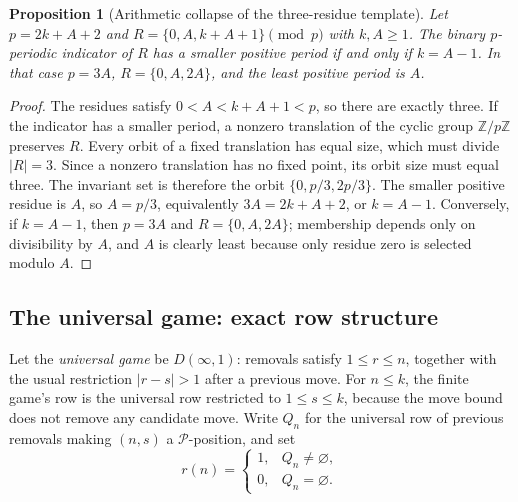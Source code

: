 \documentclass[11pt]{article}
\newtheorem{proposition}[theorem]{Proposition}
\theoremstyle{remark}
\newcommand{\Pset}{\mathcal{P}}
\begin{document}
\begin{proposition}[Arithmetic collapse of the three-residue template]\label{prop:Ccollapse}
Let $p=2k+A+2$ and $R=\{0,A,k+A+1\}\pmod p$ with $k,A\ge1$. The binary $p$-periodic indicator of $R$ has a smaller positive period if and only if $k=A-1$. In that case $p=3A$, $R=\{0,A,2A\}$, and the least positive period is $A$.
\end{proposition}
\begin{proof}
The residues satisfy $0<A<k+A+1<p$, so there are exactly three. If the indicator has a smaller period, a nonzero translation of the cyclic group $\mathbb Z/p\mathbb Z$ preserves $R$. Every orbit of a fixed translation has equal size, which must divide $|R|=3$. Since a nonzero translation has no fixed point, its orbit size must equal three. The invariant set is therefore the orbit $\{0,p/3,2p/3\}$. The smaller positive residue is $A$, so $A=p/3$, equivalently $3A=2k+A+2$, or $k=A-1$. Conversely, if $k=A-1$, then $p=3A$ and $R=\{0,A,2A\}$; membership depends only on divisibility by $A$, and $A$ is clearly least because only residue zero is selected modulo $A$.
\end{proof}

\subsection{The universal game: exact row structure}\label{sec:Cuniversal}
Let the \emph{universal game} be $D(\infty,1)$: removals satisfy $1\le r\le n$, together with the usual restriction $|r-s|>1$ after a previous move. For $n\le k$, the finite game's row is the universal row restricted to $1\le s\le k$, because the move bound does not remove any candidate move. Write $Q_n$ for the universal row of previous removals making $(n,s)$ a $\Pset$-position, and set
\[
r(n)=\begin{cases}1,&Q_n\ne\varnothing,\\0,&Q_n=\varnothing.\end{cases}
\]
\end{document}
